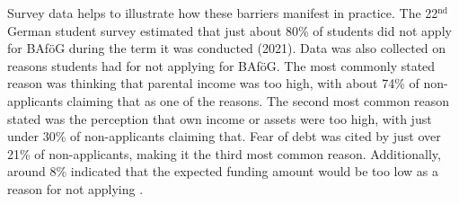 Survey data helps to illustrate how these barriers manifest in practice. The 22\( ^\text{nd} \) German student survey estimated that just about 80\% of students did not apply for BAföG during the term it was conducted (2021). Data was also collected on reasons students had for not applying for BAföG. The most commonly stated reason was thinking that parental income was too high, with about 74\% of non-applicants claiming that as one of the reasons. The second most common reason stated was the perception that own income or assets were too high, with just under 30\% of non-applicants claiming that. Fear of debt was cited by just over 21\% of non-applicants, making it the third most common reason. Additionally, around 8\% indicated that the expected funding amount would be too low as a reason for not applying \citep{kroher_studierendenbefragung_2023}.

